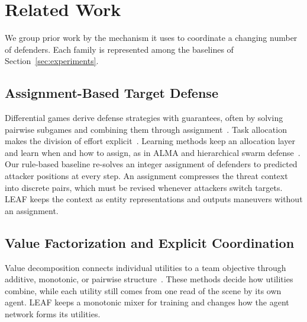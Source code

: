 \section{Related Work}
\label{sec:related}
We group prior work by the mechanism it uses to coordinate a changing number of defenders. Each family is represented among the baselines of Section~\ref{sec:experiments}.

\subsection{Assignment-Based Target Defense}
\label{subsec:rw-assignment}
Differential games derive defense strategies with guarantees, often by solving pairwise subgames and combining them through assignment~\cite{garcia2019activedefense,chen2017reachavoid,yan2022matching,garcia2021mpme}. Task allocation makes the division of effort explicit~\cite{gerkey2004allocation,choi2009auction,miele2025coordination}. Learning methods keep an allocation layer and learn when and how to assign, as in ALMA and hierarchical swarm defense~\cite{iqbal2022alma,wu2025swarm,li2025targetdefense,zhao2024swarmdefense}. Our rule-based baseline re-solves an integer assignment of defenders to predicted attacker positions at every step. An assignment compresses the threat context into discrete pairs, which must be revised whenever attackers switch targets. LEAF keeps the context as entity representations and outputs maneuvers without an assignment.

\subsection{Value Factorization and Explicit Coordination}
\label{subsec:rw-factorization}
Value decomposition connects individual utilities to a team objective through additive, monotonic, or pairwise structure~\cite{sunehag2018vdn,rashid2018qmix,boehmer2020dcg}. These methods decide how utilities combine, while each utility still comes from one read of the scene by its own agent. LEAF keeps a monotonic mixer for training and changes how the agent network forms its utilities.

